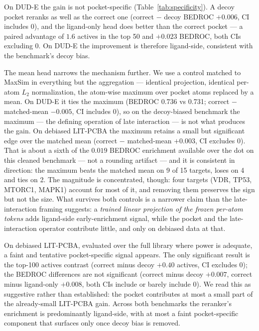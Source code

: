 \documentclass[10pt,letterpaper,twocolumn]{article}
\begin{document}
On DUD-E the gain is not pocket-specific (Table~\ref{tab:specificity}). A decoy pocket reranks as well as the correct one (correct $-$ decoy BEDROC $+0.006$, CI includes 0), and the ligand-only head does better than the correct pocket --- a paired advantage of $1.6$ actives in the top 50 and $+0.023$ BEDROC, both CIs excluding 0. On DUD-E the improvement is therefore ligand-side, consistent with the benchmark's decoy bias.

The mean head narrows the mechanism further. We use a control matched to MaxSim in everything but the aggregation --- identical projection, identical per-atom $L_2$ normalization, the atom-wise maximum over pocket atoms replaced by a mean. On DUD-E it ties the maximum (BEDROC 0.736 vs 0.731; correct $-$ matched-mean $-0.005$, CI includes 0), so on the decoy-biased benchmark the maximum --- the defining operation of late interaction --- is not what produces the gain. On debiased LIT-PCBA the maximum retains a small but significant edge over the matched mean (correct $-$ matched-mean $+0.003$, CI excludes 0). That is about a sixth of the $0.019$ BEDROC enrichment available over the dot on this cleaned benchmark --- not a rounding artifact --- and it is consistent in direction: the maximum beats the matched mean on 9 of 15 targets, loses on 4 and ties on 2. The magnitude is concentrated, though: four targets (VDR, TP53, MTORC1, MAPK1) account for most of it, and removing them preserves the sign but not the size. What survives both controls is a narrower claim than the late-interaction framing suggests: a \emph{trained linear projection of the frozen per-atom tokens} adds ligand-side early-enrichment signal, while the pocket and the late-interaction operator contribute little, and only on debiased data at that.

On debiased LIT-PCBA, evaluated over the full library where power is adequate, a faint and tentative pocket-specific signal appears. The only significant result is the top-100 actives contrast (correct minus decoy $+0.40$ actives, CI excludes 0); the BEDROC differences are not significant (correct minus decoy $+0.007$, correct minus ligand-only $+0.008$, both CIs include or barely include 0). We read this as suggestive rather than established: the pocket contributes at most a small part of the already-small LIT-PCBA gain. Across both benchmarks the reranker's enrichment is predominantly ligand-side, with at most a faint pocket-specific component that surfaces only once decoy bias is removed.
\end{document}
